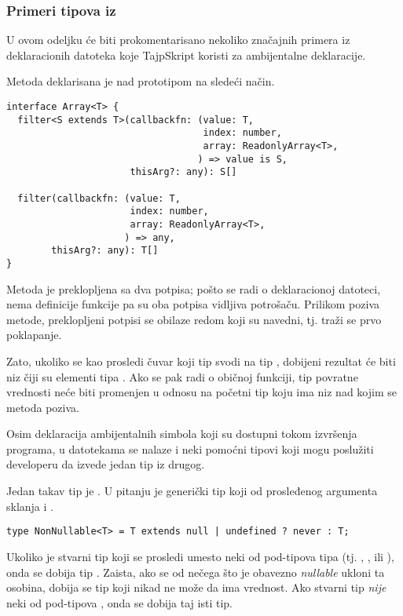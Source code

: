 \subsubsection{Primeri tipova iz }

U ovom odeljku će biti prokomentarisano nekoliko značajnih primera iz  deklaracionih datoteka koje TajpSkript koristi za ambijentalne deklaracije.

Metoda  deklarisana je nad prototipom  na sledeći način.

\begin{verbatim}
interface Array<T> {
  filter<S extends T>(callbackfn: (value: T,
                                   index: number,
                                   array: ReadonlyArray<T>,
                                  ) => value is S,
                      thisArg?: any): S[]

  filter(callbackfn: (value: T,
                      index: number,
                      array: ReadonlyArray<T>,
                     ) => any,
        thisArg?: any): T[]
}
\end{verbatim}

Metoda je preklopljena sa dva potpisa; pošto se radi o deklaracionoj  datoteci, nema definicije funkcije pa su oba potpisa vidljiva potrošaču.
Prilikom poziva metode, preklopljeni potpisi se obilaze redom koji su navedni, tj. traži se prvo poklapanje.

Zato, ukoliko se kao  prosledi čuvar koji tip  svodi na tip , dobijeni rezultat će biti niz čiji su elementi tipa .
Ako se pak radi o običnoj funkciji, tip povratne vrednosti neće biti promenjen u odnosu na početni tip koju ima niz nad kojim se metoda poziva.

Osim deklaracija ambijentalnih simbola koji su dostupni tokom izvršenja programa, u  datotekama se nalaze i neki pomoćni tipovi koji mogu poslužiti developeru da izvede jedan tip iz drugog.

Jedan takav tip je .
U pitanju je generički tip koji od prosleđenog argumenta sklanja  i .

\begin{verbatim}
type NonNullable<T> = T extends null | undefined ? never : T;
\end{verbatim}

Ukoliko je stvarni tip koji se prosledi umesto  neki od pod-tipova tipa  (tj. , ,  ili ), onda se dobija tip .
Zaista, ako se od nečega što je obavezno \textsl{nullable} ukloni ta osobina, dobija se tip koji nikad ne može da ima vrednost.
Ako stvarni tip \emph{nije} neki od pod-tipova , onda se dobija taj isti tip.

